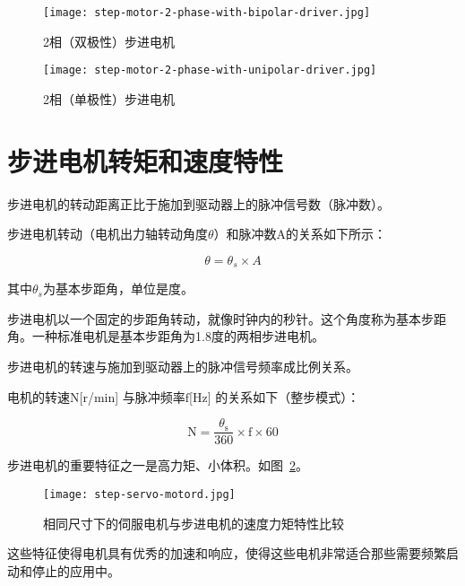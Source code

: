 \begin{figure}[htbp]
    \begin{minipage}{0.48\textwidth}
      \centering
      \texttt{[image: step-motor-2-phase-with-bipolar-driver.jpg]}
      \caption{2相（双极性）步进电机}
      \label{fig:bipolar}
    \end{minipage}\hfill
    \begin{minipage}{0.48\textwidth}
      \centering
      \texttt{[image: step-motor-2-phase-with-unipolar-driver.jpg]}
      \caption{2相（单极性）步进电机}
      \label{fig:unipolar}
    \end{minipage}
\end{figure}


\section{步进电机转矩和速度特性}

步进电机的转动距离正比于施加到驱动器上的脉冲信号数（脉冲数）。

步进电机转动（电机出力轴转动角度$\theta$）和脉冲数A的关系如下所示：

\begin{equation}
    \theta=\theta_{s} \times A
\end{equation}

其中$\theta_{s}$为基本步距角，单位是度。

步进电机以一个固定的步距角转动，就像时钟内的秒针。这个角度称为基本步距角。一种标准电机是基本步距角为1.8度的两相步进电机。

步进电机的转速与施加到驱动器上的脉冲信号频率成比例关系。

电机的转速$\mathrm{N}$[r/min] 与脉冲频率$\mathrm{f}$[Hz] 的关系如下（整步模式）：

\begin{equation}
    \mathrm{N}=\frac{\theta_{\mathrm{s}}}{360} \times \mathrm{f} \times 60
\end{equation}

步进电机的重要特征之一是高力矩、小体积。如图~\ref{fig:step-servo-motord}。

\begin{figure}[htbp]
    \centering
    \texttt{[image: step-servo-motord.jpg]}
    \caption{相同尺寸下的伺服电机与步进电机的速度力矩特性比较}
    \label{fig:step-servo-motord}
\end{figure}

这些特征使得电机具有优秀的加速和响应，使得这些电机非常适合那些需要频繁启动和停止的应用中。

